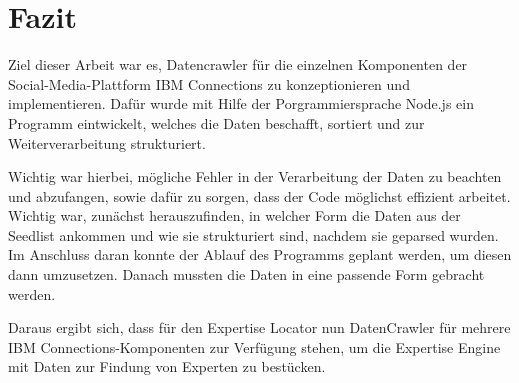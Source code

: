 
\chapter{Fazit}

Ziel dieser Arbeit war es, Datencrawler für die einzelnen Komponenten der Social-Media-Plattform IBM Connections zu konzeptionieren und implementieren. Dafür wurde mit Hilfe der Porgrammiersprache Node.js ein Programm eintwickelt, welches die Daten beschafft, sortiert und zur Weiterverarbeitung strukturiert. 

Wichtig war hierbei, mögliche Fehler in der Verarbeitung der Daten zu beachten und abzufangen, sowie dafür zu sorgen, dass der Code möglichst effizient arbeitet. \\
Wichtig war, zunächst herauszufinden, in welcher Form die Daten aus der Seedlist ankommen und wie sie strukturiert sind, nachdem sie geparsed wurden. Im Anschluss daran konnte der Ablauf des Programms geplant werden, um diesen dann umzusetzen. Danach mussten die Daten in eine passende Form gebracht werden.

Daraus ergibt sich, dass für den Expertise Locator nun DatenCrawler für mehrere IBM Connections-Komponenten zur Verfügung stehen, um die Expertise Engine mit Daten zur Findung von Experten zu bestücken.